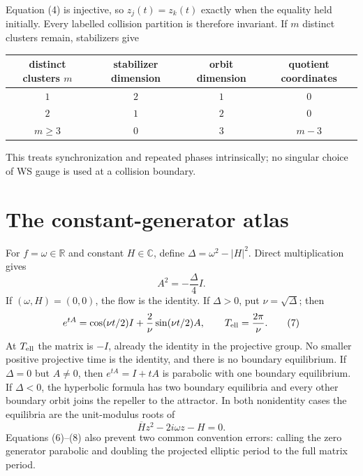 \documentclass[8pt]{extarticle}
\begin{document}
Equation (4) is injective, so $z_j(t)=z_k(t)$ exactly when the equality held
initially.  Every labelled collision partition is therefore invariant.  If
$m$ distinct clusters remain, stabilizers give
\begin{center}
\begin{tabular}{c c c c}
\toprule
distinct clusters $m$ & stabilizer dimension & orbit dimension & quotient coordinates\\
\midrule
$1$ & $2$ & $1$ & $0$\\
$2$ & $1$ & $2$ & $0$\\
$m\ge3$ & $0$ & $3$ & $m-3$\\
\bottomrule
\end{tabular}
\end{center}
This treats synchronization and repeated phases intrinsically; no singular
choice of WS gauge is used at a collision boundary.
\fi

\section{The constant-generator atlas}
For $f=\omega\in\mathbb R$ and constant $H\in\mathbb C$, define
$\Delta=\omega^2-|H|^2$.  Direct multiplication gives
\begin{equation}
 A^2=-\frac{\Delta}{4}I.                                  \tag{6}
\end{equation}
If $(\omega,H)=(0,0)$, the flow is the identity.  If $\Delta>0$, put
$\nu=\sqrt\Delta$; then
\begin{equation}
 e^{tA}=\cos(\nu t/2)I+\frac{2}{\nu}\sin(\nu t/2)A,
 \qquad T_{\rm ell}=\frac{2\pi}{\nu}.                     \tag{7}
\end{equation}
At $T_{\rm ell}$ the matrix is $-I$, already the identity in the projective
group.  No smaller positive projective time is the identity, and there is no
boundary equilibrium.  If $\Delta=0$ but $A\ne0$, then $e^{tA}=I+tA$ is
parabolic with one boundary equilibrium.  If $\Delta<0$, the hyperbolic
formula has two boundary equilibria and every other boundary orbit joins the
repeller to the attractor.  In both nonidentity cases the equilibria are the
unit-modulus roots of
\begin{equation}
 \overline H z^2-2i\omega z-H=0.                            \tag{8}
\end{equation}
Equations (6)--(8) also prevent two common convention errors: calling the zero
generator parabolic and doubling the projected elliptic period to the full
matrix period.
\end{document}
